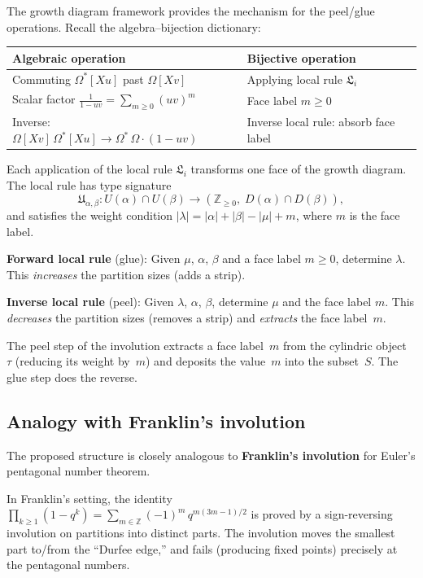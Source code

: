 \documentclass[11pt]{article}
\newcommand{\Z}{\mathbb{Z}}
\theoremstyle{plain}
\theoremstyle{definition}
\begin{document}
The growth diagram framework provides the mechanism for the
peel/glue operations.  Recall the algebra--bijection dictionary:

\begin{center}
\begin{tabular}{l|l}
\textbf{Algebraic operation} & \textbf{Bijective operation} \\ \hline
Commuting $\Omega^*[Xu]$ past $\Omega[Xv]$ &
  Applying local rule $\mathfrak{L}_i$ \\
Scalar factor $\frac{1}{1-uv} = \sum_{m \geq 0}(uv)^m$ &
  Face label $m \geq 0$ \\
Inverse: $\Omega[Xv]\,\Omega^*[Xu] \to \Omega^*\,\Omega \cdot (1-uv)$ &
  Inverse local rule: absorb face label
\end{tabular}
\end{center}

Each application of the local rule $\mathfrak{L}_i$ transforms one
face of the growth diagram.  The local rule has type signature
\[
  \mathfrak{U}_{\alpha,\beta}\colon
  U(\alpha) \cap U(\beta) \to
  (\Z_{\geq 0},\; D(\alpha) \cap D(\beta)),
\]
and satisfies the weight condition
$|\lambda| = |\alpha| + |\beta| - |\mu| + m$, where $m$ is the
face label.

\textbf{Forward local rule} (glue): Given $\mu$, $\alpha$, $\beta$
and a face label $m \geq 0$, determine $\lambda$.  This
\emph{increases} the partition sizes (adds a strip).

\textbf{Inverse local rule} (peel): Given $\lambda$, $\alpha$,
$\beta$, determine $\mu$ and the face label $m$.  This
\emph{decreases} the partition sizes (removes a strip) and
\emph{extracts} the face label~$m$.

The peel step of the involution extracts a face label~$m$ from the
cylindric object~$\tau$ (reducing its weight by~$m$) and deposits
the value~$m$ into the subset~$S$.  The glue step does the reverse.

\subsection{Analogy with Franklin's involution}

The proposed structure is closely analogous to \textbf{Franklin's
involution} for Euler's pentagonal number theorem.

In Franklin's setting, the identity
$\prod_{k \geq 1}(1 - q^k) = \sum_{m \in \Z} (-1)^m\, q^{m(3m-1)/2}$
is proved by a sign-reversing involution on partitions into distinct
parts.  The involution moves the smallest part to/from the
``Durfee edge,'' and fails (producing fixed points) precisely at
the pentagonal numbers.
\end{document}
